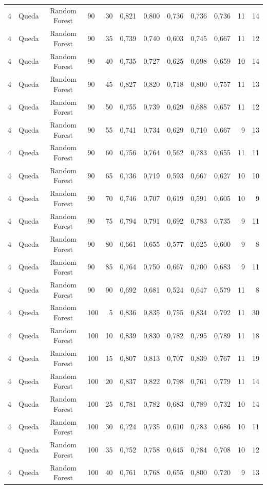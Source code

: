 \begin{longtable}{ccclrrrrrrrr}
4 & Queda & Random Forest & 90 & 30 & 0,821 & 0,800 & 0,736 & 0,736 & 0,736 & 11 & 14 \\
4 & Queda & Random Forest & 90 & 35 & 0,739 & 0,740 & 0,603 & 0,745 & 0,667 & 11 & 12 \\
4 & Queda & Random Forest & 90 & 40 & 0,735 & 0,727 & 0,625 & 0,698 & 0,659 & 10 & 14 \\
4 & Queda & Random Forest & 90 & 45 & 0,827 & 0,820 & 0,718 & 0,800 & 0,757 & 11 & 13 \\
4 & Queda & Random Forest & 90 & 50 & 0,755 & 0,739 & 0,629 & 0,688 & 0,657 & 11 & 12 \\
4 & Queda & Random Forest & 90 & 55 & 0,741 & 0,734 & 0,629 & 0,710 & 0,667 & 9 & 13 \\
4 & Queda & Random Forest & 90 & 60 & 0,756 & 0,764 & 0,562 & 0,783 & 0,655 & 11 & 11 \\
4 & Queda & Random Forest & 90 & 65 & 0,736 & 0,719 & 0,593 & 0,667 & 0,627 & 10 & 10 \\
4 & Queda & Random Forest & 90 & 70 & 0,746 & 0,707 & 0,619 & 0,591 & 0,605 & 10 & 9 \\
4 & Queda & Random Forest & 90 & 75 & 0,794 & 0,791 & 0,692 & 0,783 & 0,735 & 9 & 11 \\
4 & Queda & Random Forest & 90 & 80 & 0,661 & 0,655 & 0,577 & 0,625 & 0,600 & 9 & 8 \\
4 & Queda & Random Forest & 90 & 85 & 0,764 & 0,750 & 0,667 & 0,700 & 0,683 & 9 & 11 \\
4 & Queda & Random Forest & 90 & 90 & 0,692 & 0,681 & 0,524 & 0,647 & 0,579 & 11 & 8 \\
4 & Queda & Random Forest & 100 & 5 & 0,836 & 0,835 & 0,755 & 0,834 & 0,792 & 11 & 30 \\
4 & Queda & Random Forest & 100 & 10 & 0,839 & 0,830 & 0,782 & 0,795 & 0,789 & 11 & 18 \\
4 & Queda & Random Forest & 100 & 15 & 0,807 & 0,813 & 0,707 & 0,839 & 0,767 & 11 & 19 \\
4 & Queda & Random Forest & 100 & 20 & 0,837 & 0,822 & 0,798 & 0,761 & 0,779 & 11 & 14 \\
4 & Queda & Random Forest & 100 & 25 & 0,781 & 0,782 & 0,683 & 0,789 & 0,732 & 10 & 14 \\
4 & Queda & Random Forest & 100 & 30 & 0,724 & 0,735 & 0,610 & 0,783 & 0,686 & 10 & 11 \\
4 & Queda & Random Forest & 100 & 35 & 0,752 & 0,758 & 0,645 & 0,784 & 0,708 & 10 & 12 \\
4 & Queda & Random Forest & 100 & 40 & 0,761 & 0,768 & 0,655 & 0,800 & 0,720 & 9 & 13 \\

\end{longtable}
